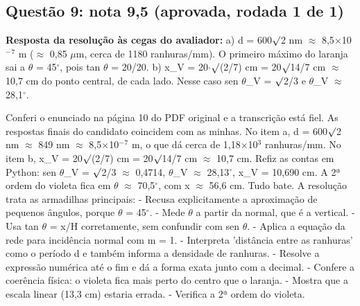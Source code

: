 \documentclass{article}%
\begin{document}
\subsection*{Questão 9: nota 9,5 (aprovada, rodada 1 de 1)}%
\textbf{Resposta da resolução às cegas do avaliador:} a) d = 600$\surd$2 nm $\approx$ 8,5$\times$10$^{-}$$^{7}$ m ($\approx$ 0,85 $\mu$m, cerca de 1180 ranhuras/mm). O primeiro máximo do laranja sai a $\theta$ = 45$^\circ$, pois tan $\theta$ = 20/20.\newline%
b) x\_V = 20$\cdot$$\surd$(2/7) cm = 20$\surd$14/7 cm $\approx$ 10,7 cm do ponto central, de cada lado. Nesse caso sen $\theta$\_V = $\surd$2/3 e $\theta$\_V $\approx$ 28,1$^\circ$.\par %
Conferi o enunciado na página 10 do PDF original e a transcrição está fiel. As respostas finais do candidato coincidem com as minhas. No item a, d = 600$\surd$2 nm $\approx$ 849 nm $\approx$ 8,5$\times$10$^{-}$$^{7}$ m, o que dá cerca de 1,18$\times$10$^3$ ranhuras/mm. No item b, x\_V = 20$\surd$(2/7) cm = 20$\surd$14/7 cm $\approx$ 10,7 cm. Refiz as contas em Python: sen $\theta$\_V = $\surd$2/3 $\approx$ 0,4714, $\theta$\_V $\approx$ 28,13$^\circ$, x\_V = 10,690 cm. A 2ª ordem do violeta fica em $\theta$ $\approx$ 70,5$^\circ$, com x $\approx$ 56,6 cm. Tudo bate.\newline%
\newline%
A resolução trata as armadilhas principais:\newline%
{-} Recusa explicitamente a aproximação de pequenos ângulos, porque $\theta$ = 45$^\circ$.\newline%
{-} Mede $\theta$ a partir da normal, que é a vertical.\newline%
{-} Usa tan $\theta$ = x/H corretamente, sem confundir com sen $\theta$.\newline%
{-} Aplica a equação da rede para incidência normal com m = 1.\newline%
{-} Interpreta 'distância entre as ranhuras' como o período d e também informa a densidade de ranhuras.\newline%
{-} Resolve a expressão numérica até o fim e dá a forma exata junto com a decimal.\newline%
{-} Confere a coerência física: o violeta fica mais perto do centro que o laranja.\newline%
{-} Mostra que a escala linear (13,3 cm) estaria errada.\newline%
{-} Verifica a 2ª ordem do violeta.\newline%
$$
\end{document}
